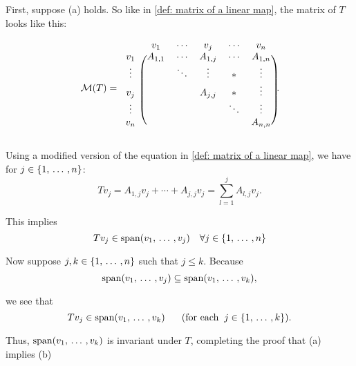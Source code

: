 \begin{prf}
  First, suppose (a) holds. So like in \ref{def: matrix of a linear map}, the matrix of $T$ looks like this:

  \begin{minipage}{\linewidth}
  \begin{equation}
  \mathcal{M} (T) =
  \begin{blockarray}{cccccc}
    & v_1     & \cdots & v_j      & \cdots & v_n     \\
    \begin{block}{c(ccccc)}
      v_1    & A_{1,1} & \cdots & A_{1,j}  & \cdots & A_{1,n} \\
      \vdots &         & \ddots & \vdots   &   *    & \vdots  \\
      v_j &         &        & A_{j,j}  &   *    & \vdots  \\
      \vdots &         &        &          & \ddots & \vdots  \\
      v_n    &         &        &          &        & A_{n,n} \\
    \end{block}
  \end{blockarray}.
  \end{equation}
  \end{minipage}

  \StepOne Using a modified version of the equation in \ref{def: matrix of a linear map}, we have for $j\in \{1, {\, \ldots \,\,}, n \}$:
  \begin{equation}
    T v_j = A_{1,j} v_j + \cdots + A_{j,j} v_j = \sum_{l=1}^{j} A_{l,j} v_j.
  \end{equation}

  This implies
  \begin{equation}
    T v_j \in \operatorname{span} (v_1, {\, \ldots \,\,}, v_j) \quad \forall j\in \{1, {\, \ldots \,\,}, n \}
  \end{equation}

  Now suppose $j, k \in \{1, {\, \ldots \,\,}, n \}$ such that $j \leq  k.$ Because
  \begin{equation}
    \operatorname{span} (v_1, {\, \ldots \,\,}, v_j) \subseteq \operatorname{span} (v_1, {\, \ldots \,\,}, v_k),
  \end{equation}

  we see that
  \begin{equation}
    T v_j \in \operatorname{span} (v_1, {\, \ldots \,\,}, v_k) \quad \;\;\, \text{(for each}\;\; j \in \{1, {\, \ldots \,\,}, k\}).
  \end{equation}

  Thus, $\operatorname{span} (v_1, {\, \ldots \,\,}, v_k)$ is invariant under $T$, completing the proof that (a) implies (b)


\end{prf}
